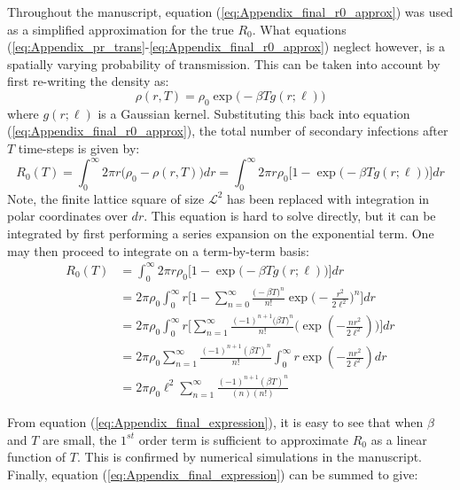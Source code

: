 Throughout the manuscript, equation (\ref{eq:Appendix_final_r0_approx}) was used as a simplified approximation for the true $R_0$. What equations (\ref{eq:Appendix_pr_trans}-\ref{eq:Appendix_final_r0_approx}) neglect however, is a spatially varying probability of transmission. This can be taken into account by first re-writing the density as:
\begin{equation}
    \rho(r, T) = \rho_0\exp \big( -\beta T g(r; \ell) \big)
\end{equation}
where $g(r;\ell)$ is a Gaussian kernel. Substituting this back into equation (\ref{eq:Appendix_final_r0_approx}), the total number of secondary infections after $T$ time-steps is given by:
\begin{equation}
   R_0(T) = \int ^\infty _0 2\pi r \big (\rho_0 - \rho(r, T)\big)dr =  \int ^\infty _0 2\pi r \rho_0 \Big[1 - \exp\big(-\beta T g(r;\ell)\big) \Big]dr
\end{equation}
Note, the finite lattice square of size $\mathcal{L}^2$ has been replaced with integration in polar coordinates over $dr$. This equation is hard to solve directly, but it can be integrated by first performing a series expansion on the exponential term. One may then proceed to integrate on a term-by-term basis:
\begin{equation} \label{eq:Appendix_final_expression}
\begin{split}
R_0(T) & = \int^\infty_0 2\pi r \rho_0 \Big[1 - \exp \big( -\beta T g(r;\ell)\big)\Big]dr \\
& = 2\pi\rho_0 \int^\infty _0 r \Big[1 - \sum^\infty_{n=0} \frac{\big(-\beta T)^n}{n!} \exp\big(-\frac{r^2}{2\ell^2}\big)^n  \Big] dr \\
& = 2\pi\rho_0 \int^\infty _0 r \Big[\sum^\infty_{n=1} \frac{(-1)^{n+1}\big(\beta T)^n}{n!} \Big(\exp(-\frac{n r^2}{2\ell^2} ) \Big)  \Big] dr \\
& = 2\pi\rho_0 \sum^{\infty}_{n=1} \frac{(-1)^{n+1} (\beta T)^n}{n!} \int^\infty _0 r \exp(-\frac{n r^2}{2\ell^2})dr  \\
& = 2\pi\rho_0 \ell^2 \sum^{\infty}_{n=1} \frac{(-1)^{n+1}(\beta T)^n}{(n)(n!) }
\end{split}
\end{equation}

From equation (\ref{eq:Appendix_final_expression}), it is easy to see that when $\beta$ and $T$ are small, the $1^{st}$ order term is sufficient to approximate $R_0$ as a linear function of $T$. This is confirmed by numerical simulations in the manuscript. Finally, equation (\ref{eq:Appendix_final_expression}) can be summed to give:

